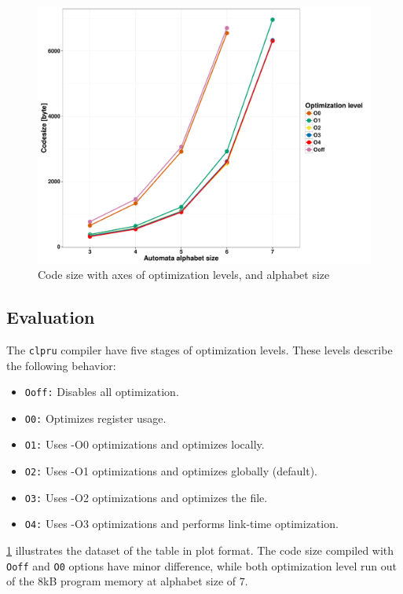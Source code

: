 \begin{figure}
	\centering
	\includegraphics[width = \textwidth]{include/figures/code_size}
	\caption{Code size with axes of optimization levels, and alphabet size}
\label{fig:code_size}
\end{figure}

\subsection{Evaluation}

The \texttt{clpru} compiler have five stages of optimization levels. These levels describe the following behavior:
\begin{itemize}
\item \texttt{Ooff:} Disables all optimization.
\item \texttt{O0:} Optimizes register usage.
\item \texttt{O1:} Uses -O0 optimizations and optimizes locally.
\item \texttt{O2:} Uses -O1 optimizations and optimizes globally (default).
\item \texttt{O3:} Uses -O2 optimizations and optimizes the file.
\item \texttt{O4:} Uses -O3 optimizations and performs link-time optimization.
\end{itemize}

\cref{fig:code_size} illustrates the dataset of the table in plot format. The code size compiled with \texttt{Ooff} and \texttt{O0} options have minor difference, while both optimization level run out of the \si{8}{kB} program memory at alphabet size of $7$.

